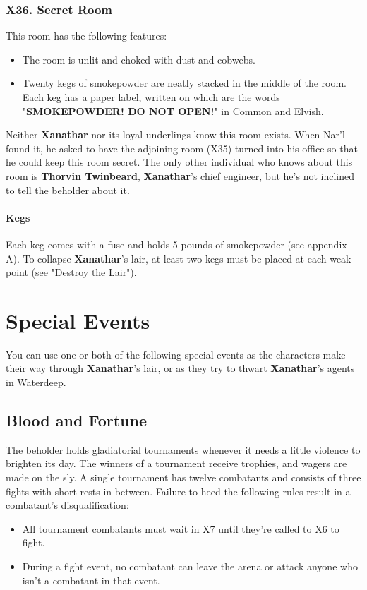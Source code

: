 \documentclass[10pt,a4paper,twoside,twocolumn,openany,nodeprecatedcode]{dndbook}
\begin{document}
\subsubsection{X36. Secret Room}
This room has the following features:
\begin{itemize}

\item The room is unlit and choked with dust and cobwebs.
\item Twenty kegs of smokepowder are neatly stacked in the middle of the room. Each keg has a paper label, written on which are the words "\textbf{SMOKEPOWDER! DO NOT OPEN!}" in Common and Elvish.
\end{itemize}


Neither \textbf{Xanathar} nor its loyal underlings know this room exists. When Nar'l found it, he asked to have the adjoining room (X35) turned into his office so that he could keep this room secret. The only other individual who knows about this room is \textbf{Thorvin Twinbeard}, \textbf{Xanathar}'s chief engineer, but he's not inclined to tell the beholder about it.
\paragraph{Kegs}
Each keg comes with a fuse and holds 5 pounds of smokepowder (see appendix A). To collapse \textbf{Xanathar}'s lair, at least two kegs must be placed at each weak point (see "Destroy the Lair").
\section{Special Events}
You can use one or both of the following special events as the characters make their way through \textbf{Xanathar}'s lair, or as they try to thwart \textbf{Xanathar}'s agents in Waterdeep.
\subsection{Blood and Fortune}
The beholder holds gladiatorial tournaments whenever it needs a little violence to brighten its day. The winners of a tournament receive trophies, and wagers are made on the sly.
A single tournament has twelve combatants and consists of three fights with short rests in between. Failure to heed the following rules result in a combatant's disqualification:
\begin{itemize}

\item All tournament combatants must wait in X7 until they're called to X6 to fight.
\item During a fight event, no combatant can leave the arena or attack anyone who isn't a combatant in that event.
\end{itemize}
\end{document}

